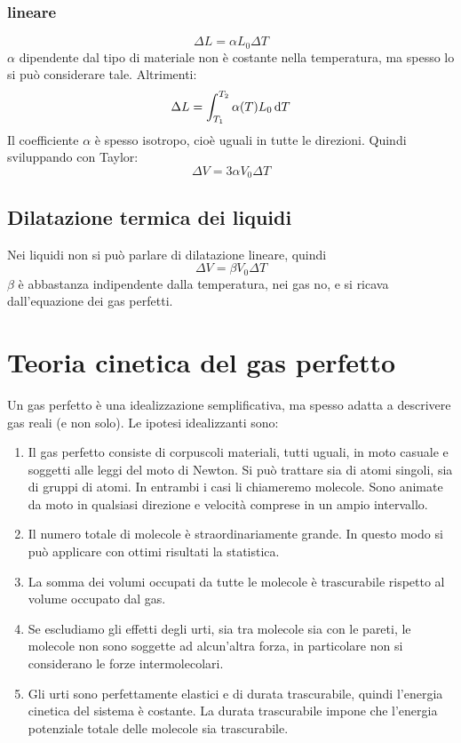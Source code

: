 \subsubsection{lineare}
\begin{equation}
\Delta L=\alpha L_0\Delta T
\end{equation}
$\alpha$ dipendente dal tipo di materiale non è costante nella temperatura, ma spesso lo si può considerare tale. Altrimenti:
\begin{equation}
\Delta L=\int_{T_1}^{T_2} \alpha(T) L_0 \,\mathrm{d} T
\end{equation}
Il coefficiente $\alpha$ è spesso isotropo, cioè uguali in tutte le direzioni. Quindi sviluppando con Taylor:
\begin{equation}
\Delta V=3\alpha V_0\Delta T
\end{equation}
\subsection{Dilatazione termica dei liquidi}
Nei liquidi non si può parlare di dilatazione lineare, quindi
\begin{equation}
\Delta V=\beta V_0\Delta T
\end{equation}
$\beta$ è abbastanza indipendente dalla temperatura, nei gas no, e si ricava dall'equazione dei gas perfetti.

\section{Teoria cinetica del gas perfetto}
\label{gas perfetto}
Un gas perfetto è una idealizzazione semplificativa, ma spesso adatta a descrivere gas reali (e non solo). Le ipotesi idealizzanti sono:
\begin{enumerate}
\item Il gas perfetto consiste di corpuscoli materiali, tutti uguali, in moto casuale e soggetti alle leggi del moto di Newton. Si può trattare sia di atomi singoli, sia di gruppi di atomi. In entrambi i casi li chiameremo molecole. Sono animate da moto in qualsiasi direzione e velocità comprese in un ampio intervallo.
\item Il numero totale di molecole è straordinariamente grande. In questo modo si può applicare con ottimi risultati la statistica.
\item La somma dei volumi occupati da tutte le molecole è trascurabile rispetto al volume occupato dal gas.
\item Se escludiamo gli effetti degli urti, sia tra molecole sia con le pareti, le molecole non sono soggette ad alcun'altra forza, in particolare non si considerano le forze intermolecolari.
\item Gli urti sono perfettamente elastici e di durata trascurabile, quindi l'energia cinetica del sistema è costante. La durata trascurabile impone che l'energia potenziale totale delle molecole sia trascurabile.
\end{enumerate}
